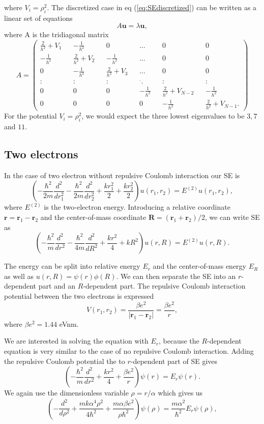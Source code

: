 \documentclass[norsk,a4paper,12pt]{article}
\begin{document}
where $V_i=\rho_i^2$.
The discretized case in eq (\ref{eq:SEdiscretized}) can be written as a linear set of equations 
\begin{equation}
A\textbf{u} = \lambda \textbf{u},
\label{eq:Aulambdau}
\end{equation}
where A is the tridiagonal matrix
\setcounter{MaxMatrixCols}{20}
\begin{equation}
A=\begin{pmatrix}
\frac{2}{h^2} + V_1 && -\frac{1}{h^2} && 0 && ... && 0 && 0 \\
-\frac{1}{h^2} && \frac{2}{h^2} + V_2 && -\frac{1}{h^2} && ... && 0 && 0 \\
0 && -\frac{1}{h^2} && \frac{2}{h^2} + V_3 && ... && 0 && 0 \\
: && : && : && ^{\textbf{.}}. && : && : \\
0 && 0 && 0 && -\frac{1}{h^2} && \frac{2}{h^2} + V_{N-2} && -\frac{1}{h^2} \\
0 && 0 && 0 && 0 && -\frac{1}{h^2} && \frac{2}{h^2} + V_{N-1}.
\end{pmatrix}
\label{eq:A}
\end{equation}
For the potential $V_i = \rho_i^2$, we would expect the three lowest eigenvalues to be $3, 7$ and $11$.
\subsection{Two electrons}
In the case of two electron without repulsive Coulomb interaction our SE is 
$$\left(-\frac{\hbar ^2}{2m}\frac{d^2}{dr_1^2} - \frac{\hbar ^2}{2m}\frac{d^2}{dr_2^2} + \frac{kr_1^2}{2} + \frac{kr_2^2}{2}\right)u(r_1,r_2) = E^{(2)}u(r_1,r_2),$$
where $E^{(2)}$ is the two-electron energy. Introducing a relative coordinate $\textbf{r} = \textbf{r}_1-\textbf{r}_2$ and the center-of-mass coordinate $\textbf{R} = (\textbf{r}_1 + \textbf{r}_2)/2$, we can write SE as
$$\left(-\frac{\hbar ^2}{m}\frac{d^2}{dr^2} - \frac{\hbar ^2}{4m}\frac{d^2}{dR^2} + \frac{kr^2}{4} + kR^2\right)u(r,R) = E^{(2)}u(r,R).$$


The energy can be split into relative energy $E_r$ and the center-of-mass energy $E_R$ as well as $u(r,R) = \psi(r) \phi(R)$. We can then separate the SE into an $r$-dependent part and an $R$-dependent part. The repulsive Coulomb interaction potential between the two electrons is expressed $$V(r_1,r_2) = \frac{\beta e^2}{|\textbf{r}_1-\textbf{r}_2|} = \frac{\beta e^2}{r},$$ where $\beta e^2 = 1.44$ eVnm. 

We are interested in solving the equation with $E_r$, because the $R$-dependent equation is very similar to the case of no repulsive Coulomb interaction. Adding the repulsive Coulomb potential the to $r$-dependent part of SE gives
$$\left(-\frac{\hbar ^2}{m}\frac{d^2}{dr^2} + \frac{kr^2}{4} + \frac{\beta e^2}{r}\right)\psi(r) = E_r\psi(r).$$ 
We again use the dimensionless variable $\rho = r/\alpha$ which gives us 
\begin{equation}
\left(-\frac{d^2}{d\rho ^2} + \frac{mk\alpha ^4 \rho ^2}{4\hbar ^2} + \frac{m\alpha \beta e^2}{\rho \hbar^2}\right)\psi(\rho) = \frac{m\alpha ^2}{\hbar^2}E_r\psi(\rho),
\label{eq:SEdimlessvars}
\end{equation}
\end{document}

